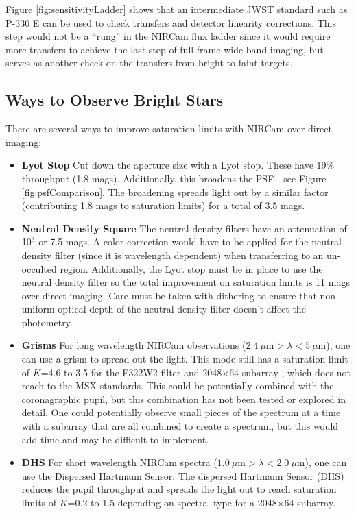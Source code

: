 \documentclass{aastex6}
\begin{document}
Figure \ref{fig:sensitivityLadder} shows that an intermediate JWST standard such as P-330 E can be used to check transfers and detector linearity corrections.
This step would not be a ``rung'' in the NIRCam flux ladder since it would require more transfers to achieve the last step of full frame wide band imaging, but serves as another check on the transfers from bright to faint targets.

\subsection{Ways to Observe Bright Stars}\label{sec:brightStarMode}

There are several ways to improve saturation limits with NIRCam over direct imaging:
\begin{itemize}
\item \textbf{Lyot Stop} Cut down the aperture size with a Lyot stop. These have 19\% throughput (1.8 mags). Additionally, this broadens the PSF - see Figure \ref{fig:psfComparison}.
The broadening spreads light out by a similar factor (contributing 1.8 mags to saturation limits) for a total of 3.5 mags.
\item \textbf{Neutral Density Square} The neutral density filters have an attenuation of 10$^3$ or 7.5 mags. A color correction would have to be applied for the neutral density filter (since it is wavelength dependent) when transferring to an un-occulted region.
Additionally, the Lyot stop must be in place to use the neutral density filter so the total improvement on saturation limits is 11 mags over direct imaging.
Care must be taken with dithering to ensure that non-uniform optical depth of the neutral density filter doesn't affect the photometry.
\item \textbf{Grisms} For long wavelength NIRCam observations ($2.4~\mu$m$ > \lambda < 5~\mu$m), one can use a grism to spread out the light. This mode still has a saturation limit of $K$=4.6 to 3.5 for the F322W2  filter and 2048$\times$64 subarray \citep{greene2016wfss}, which does not reach to the MSX standards.
This could be potentially combined with the coronagraphic pupil, but this combination has not been tested or explored in detail.
One could potentially observe small pieces of the spectrum at a time with a subarray that are all combined to create a spectrum, but this would add time and may be difficult to implement.
\item \textbf{DHS} For short wavelength NIRCam spectra ($1.0~\mu$m$ > \lambda < 2.0~\mu$m), one can use the Dispersed Hartmann Sensor. The dispersed Hartmann Sensor (DHS) reduces the pupil throughput and spreads the light out to reach saturation limits of $K$=0.2 to 1.5 depending on spectral type \citep{schlawin2017dhs} for a 2048$\times$64 subarray.

\end{itemize}
\end{document}
